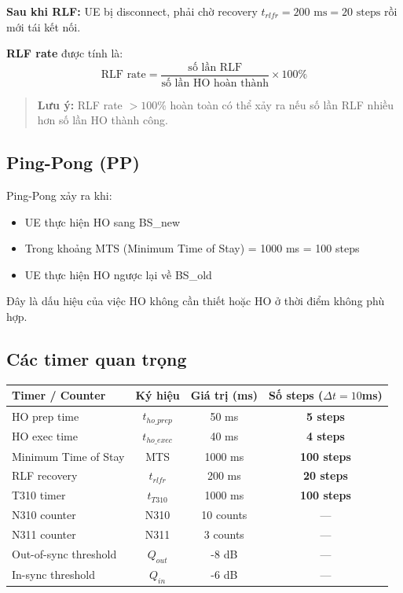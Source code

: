 \documentclass[11pt]{article}
\begin{document}
\textbf{Sau khi RLF:} UE bị disconnect, phải chờ recovery $t_{rlfr} = 200\text{ ms} = 20\text{ steps}$ rồi mới tái kết nối.

\textbf{RLF rate} được tính là:
\[
\text{RLF rate} = \frac{\text{số lần RLF}}{\text{số lần HO hoàn thành}} \times 100\%
\]

\begin{quote}
\textbf{Lưu ý:} RLF rate $> 100\%$ hoàn toàn có thể xảy ra nếu số lần RLF nhiều hơn số lần HO thành công.
\end{quote}

\subsection{Ping-Pong (PP)}

Ping-Pong xảy ra khi:
\begin{itemize}
  \item UE thực hiện HO sang BS\_new
  \item Trong khoảng MTS (Minimum Time of Stay) = 1000 ms = 100 steps
  \item UE thực hiện HO ngược lại về BS\_old
\end{itemize}

Đây là dấu hiệu của việc HO không cần thiết hoặc HO ở thời điểm không phù hợp.

\subsection{Các timer quan trọng}

\begin{longtable}{@{}lccc@{}}
\toprule
\textbf{Timer / Counter} & \textbf{Ký hiệu} & \textbf{Giá trị (ms)} & \textbf{Số steps ($\Delta t = 10$ms)} \\
\midrule
\endhead
HO prep time & $t_{ho\_prep}$ & 50 ms & \textbf{5 steps} \\
HO exec time & $t_{ho\_exec}$ & 40 ms & \textbf{4 steps} \\
Minimum Time of Stay & MTS & 1000 ms & \textbf{100 steps} \\
RLF recovery & $t_{rlfr}$ & 200 ms & \textbf{20 steps} \\
T310 timer & $t_{T310}$ & 1000 ms & \textbf{100 steps} \\
N310 counter & N310 & 10 counts & --- \\
N311 counter & N311 & 3 counts & --- \\
Out-of-sync threshold & $Q_{out}$ & -8 dB & --- \\
In-sync threshold & $Q_{in}$ & -6 dB & --- \\
\bottomrule
\end{longtable}
\end{document}
